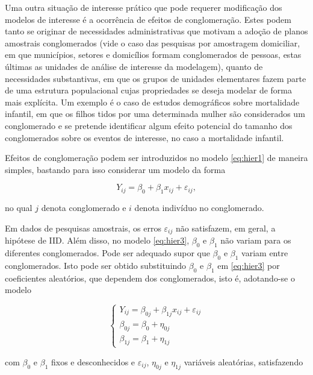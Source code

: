 \documentclass[]{book}
\numberwithin{example}{chapter}
\numberwithin{remark}{chapter}
\numberwithin{definition}{chapter}
\begin{document}
Uma outra situação de interesse prático que pode requerer modificação
dos modelos de interesse é a ocorrência de efeitos de conglomeração.
Estes podem tanto se originar de necessidades administrativas que
motivam a adoção de planos amostrais conglomerados (vide o caso das
pesquisas por amostragem domiciliar, em que municípios, setores e
domicílios formam conglomerados de pessoas, estas últimas as unidades de
análise de interesse da modelagem), quanto de necessidades substantivas,
em que os grupos de unidades elementares fazem parte de uma estrutura
populacional cujas propriedades se deseja modelar de forma mais
explícita. Um exemplo é o caso de estudos demográficos sobre mortalidade
infantil, em que os filhos tidos por uma determinada mulher são
considerados um conglomerado e se pretende identificar algum efeito
potencial do tamanho dos conglomerados sobre os eventos de interesse, no
caso a mortalidade infantil.

Efeitos de conglomeração podem ser introduzidos no modelo \eqref{eq:hier1}
de maneira simples, bastando para isso considerar um modelo da forma

\begin{equation}
Y_{ij}=\beta _{0}+\beta _{1}x_{ij}+\varepsilon _{ij}, \label{eq:hier3}
\end{equation}

no qual \(j\) denota conglomerado e \(i\) denota indivíduo no
conglomerado.

Em dados de pesquisas amostrais, os erros \(\varepsilon _{ij}\) não
satisfazem, em geral, a hipótese de IID. Além disso, no modelo
\eqref{eq:hier3}, \(\beta _{0}\) e \(\beta _{1}\) não variam para os
diferentes conglomerados. Pode ser adequado supor que \(\beta _{0}\) e
\(\beta _{1}\) variam entre conglomerados. Isto pode ser obtido
substituindo \(\beta _{0}\) e \(\beta _{1}\) em \eqref{eq:hier3} por
coeficientes aleatórios, que dependem dos conglomerados, isto é,
adotando-se o modelo

\begin{equation}
\left\{ 
\begin{array}{l}
Y_{ij}=\beta _{0j}+\beta _{1j}x_{ij}+\varepsilon _{ij} \\ 
\beta _{0j}=\beta _{0}+\eta _{0j} \\ 
\beta _{1j}=\beta _{1}+\eta _{1j}
\end{array}
\right.  \label{eq:hier4}
\end{equation}

com \(\beta _{0}\) e \(\beta _{1}\) fixos e desconhecidos e
\(\varepsilon _{ij}\), \(\eta _{0j}\) e \(\eta _{1j}\) variáveis
aleatórias, \allowbreak
satisfazendo
\end{document}
